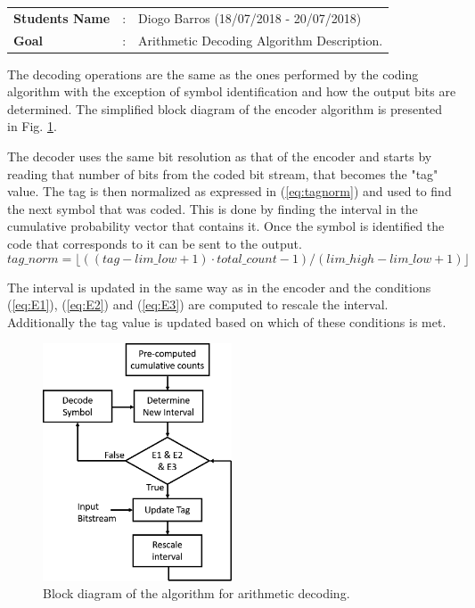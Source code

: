 \begin{refsection}
\begin{tcolorbox}	
\begin{tabular}{p{2.75cm} p{0.2cm} p{10.5cm}} 	
\textbf{Students Name}  &:& Diogo Barros (18/07/2018 - 20/07/2018) \\
\textbf{Goal}          &:& Arithmetic Decoding Algorithm Description.
\end{tabular}
\end{tcolorbox}

The decoding operations are the same as the ones performed by the coding algorithm with the exception of symbol identification and how the output bits are determined. The simplified block diagram of the encoder algorithm is presented in Fig. \ref{fig:arithDecBlockDiagr}.

The decoder uses the same bit resolution as that of the encoder and starts by reading that number of bits from the coded bit stream, that becomes the "tag" value. The tag is then normalized as expressed in (\ref{eq:tagnorm}) and used to find the next symbol that was coded. This is done by finding the interval in the cumulative probability vector that contains it. Once the symbol is identified the code that corresponds to it can be sent to the output.
\begin{equation} \label{eq:tagnorm}
tag\_norm = \lfloor((tag - lim\_low + 1) \cdot total\_count - 1) / (lim\_high - lim\_low + 1)\rfloor
\end{equation}

The interval is updated in the same way as in the encoder and the conditions (\ref{eq:E1}), (\ref{eq:E2}) and (\ref{eq:E3}) are computed to rescale the interval. Additionally the tag value is updated based on which of these conditions is met.

\begin{figure}[H]
	\centering
	\includegraphics[width=0.5\textwidth]{./sdf/eit_46084_arithmetic_encoder_decoder/figures/ArithDecoderBlockDiagram.png}
	\caption{Block diagram of the algorithm for arithmetic decoding.} \label{fig:arithDecBlockDiagr}
\end{figure}


\end{refsection}
